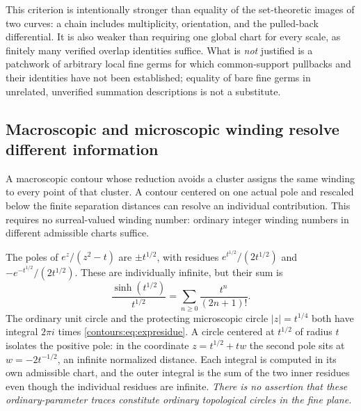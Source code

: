 \documentclass[11pt,letterpaper]{article}
\theoremstyle{definition}
\theoremstyle{remark}
\numberwithin{equation}{section}
\begin{document}
This criterion is intentionally stronger than equality of the set-theoretic images
of two curves: a chain includes multiplicity, orientation, and the pulled-back
differential. It is also weaker than requiring one global chart for every scale, as
finitely many verified overlap identities suffice. What is \emph{not} justified is a
patchwork of arbitrary local fine germs for which common-support pullbacks and
their identities have not been established; equality of bare fine germs in
unrelated, unverified summation descriptions is not a substitute.

\subsection{Macroscopic and microscopic winding resolve different information}
A macroscopic contour whose reduction avoids a cluster assigns the same winding to
every point of that cluster. A contour centered on one actual pole and rescaled
below the finite separation distances can resolve an individual contribution. This
requires no surreal-valued winding number: ordinary integer winding numbers in
different admissible charts suffice.

\begin{example}
\label{contours:ex:expcluster}
The poles of $e^z/(z^2-t)$ are $\pm t^{1/2}$, with residues
$e^{t^{1/2}}/(2t^{1/2})$ and $-e^{-t^{1/2}}/(2t^{1/2})$. These are individually
infinite, but their sum is
\begin{equation}\label{contours:eq:expresidue}
  \frac{\sinh(t^{1/2})}{t^{1/2}}=\sum_{n\ge0}\frac{t^n}{(2n+1)!} .
\end{equation}
The ordinary unit circle and the protecting microscopic circle $|z|=t^{1/4}$ both
have integral $2\pi i$ times \eqref{contours:eq:expresidue}. A circle centered at
$t^{1/2}$ of radius $t$ isolates the positive pole: in the coordinate
$z=t^{1/2}+tw$ the second pole sits at $w=-2t^{-1/2}$, an infinite normalized
distance. Each integral is computed in its own admissible chart, and the outer
integral is the sum of the two inner residues even though the individual residues
are infinite. \emph{There is no assertion that these ordinary-parameter traces
constitute ordinary topological circles in the fine plane.}
\end{example}
\end{document}
